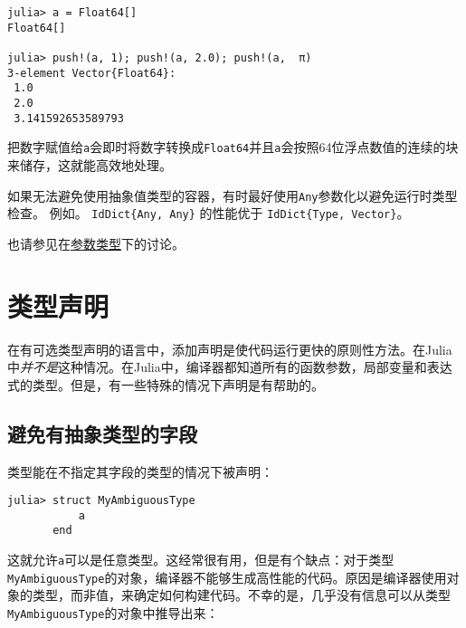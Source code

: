 \begin{verbatim}
julia> a = Float64[]
Float64[]

julia> push!(a, 1); push!(a, 2.0); push!(a,  π)
3-element Vector{Float64}:
 1.0
 2.0
 3.141592653589793
\end{verbatim}



把数字赋值给\texttt{a}会即时将数字转换成\texttt{Float64}并且\texttt{a}会按照64位浮点数值的连续的块来储存，这就能高效地处理。



如果无法避免使用抽象值类型的容器，有时最好使用\texttt{Any}参数化以避免运行时类型检查。 例如。 \texttt{IdDict\{Any, Any\}} 的性能优于 \texttt{IdDict\{Type, Vector\}}。



也请参见在\href{@ref}{参数类型}下的讨论。



\hypertarget{11271598028486730305}{}


\section{类型声明}



在有可选类型声明的语言中，添加声明是使代码运行更快的原则性方法。在Julia中\emph{并不是}这种情况。在Julia中，编译器都知道所有的函数参数，局部变量和表达式的类型。但是，有一些特殊的情况下声明是有帮助的。



\hypertarget{17004910976199348766}{}


\subsection{避免有抽象类型的字段}



类型能在不指定其字段的类型的情况下被声明：




\begin{verbatim}
julia> struct MyAmbiguousType
           a
       end
\end{verbatim}



这就允许\texttt{a}可以是任意类型。这经常很有用，但是有个缺点：对于类型\texttt{MyAmbiguousType}的对象，编译器不能够生成高性能的代码。原因是编译器使用对象的类型，而非值，来确定如何构建代码。不幸的是，几乎没有信息可以从类型\texttt{MyAmbiguousType}的对象中推导出来：




